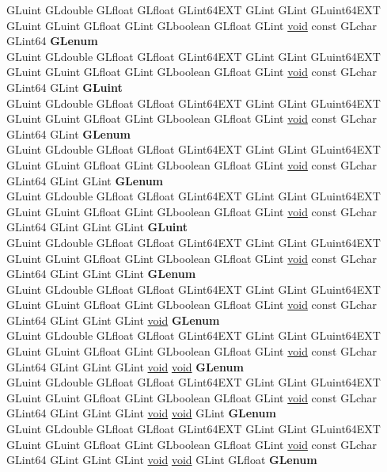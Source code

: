 \begin{DoxyCompactItemize}
\begin{tabbing}
\>GLuint GLdouble GLfloat GLfloat GLint64EXT GLint GLint GLuint64EXT GLuint GLuint GLfloat GLint GLboolean GLfloat GLint \hyperlink{interfacevoid}{void} const GLchar GLint64 {\bfseries GLenum}\\
\>GLuint GLdouble GLfloat GLfloat GLint64EXT GLint GLint GLuint64EXT GLuint GLuint GLfloat GLint GLboolean GLfloat GLint \hyperlink{interfacevoid}{void} const GLchar GLint64 GLint {\bfseries GLuint}\\
\>GLuint GLdouble GLfloat GLfloat GLint64EXT GLint GLint GLuint64EXT GLuint GLuint GLfloat GLint GLboolean GLfloat GLint \hyperlink{interfacevoid}{void} const GLchar GLint64 GLint {\bfseries GLenum}\\
\>GLuint GLdouble GLfloat GLfloat GLint64EXT GLint GLint GLuint64EXT GLuint GLuint GLfloat GLint GLboolean GLfloat GLint \hyperlink{interfacevoid}{void} const GLchar GLint64 GLint GLint {\bfseries GLenum}\\
\>GLuint GLdouble GLfloat GLfloat GLint64EXT GLint GLint GLuint64EXT GLuint GLuint GLfloat GLint GLboolean GLfloat GLint \hyperlink{interfacevoid}{void} const GLchar GLint64 GLint GLint GLint {\bfseries GLuint}\\
\>GLuint GLdouble GLfloat GLfloat GLint64EXT GLint GLint GLuint64EXT GLuint GLuint GLfloat GLint GLboolean GLfloat GLint \hyperlink{interfacevoid}{void} const GLchar GLint64 GLint GLint GLint {\bfseries GLenum}\\
\>GLuint GLdouble GLfloat GLfloat GLint64EXT GLint GLint GLuint64EXT GLuint GLuint GLfloat GLint GLboolean GLfloat GLint \hyperlink{interfacevoid}{void} const GLchar GLint64 GLint GLint GLint \hyperlink{interfacevoid}{void} {\bfseries GLenum}\\
\>GLuint GLdouble GLfloat GLfloat GLint64EXT GLint GLint GLuint64EXT GLuint GLuint GLfloat GLint GLboolean GLfloat GLint \hyperlink{interfacevoid}{void} const GLchar GLint64 GLint GLint GLint \hyperlink{interfacevoid}{void} \hyperlink{interfacevoid}{void} {\bfseries GLenum}\\
\>GLuint GLdouble GLfloat GLfloat GLint64EXT GLint GLint GLuint64EXT GLuint GLuint GLfloat GLint GLboolean GLfloat GLint \hyperlink{interfacevoid}{void} const GLchar GLint64 GLint GLint GLint \hyperlink{interfacevoid}{void} \hyperlink{interfacevoid}{void} GLint {\bfseries GLenum}\\
\>GLuint GLdouble GLfloat GLfloat GLint64EXT GLint GLint GLuint64EXT GLuint GLuint GLfloat GLint GLboolean GLfloat GLint \hyperlink{interfacevoid}{void} const GLchar GLint64 GLint GLint GLint \hyperlink{interfacevoid}{void} \hyperlink{interfacevoid}{void} GLint GLfloat {\bfseries GLenum}\\

\end{tabbing}
\end{DoxyCompactItemize}

